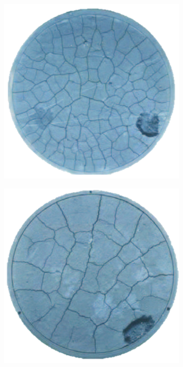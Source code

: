 \begin{figure}[!htb]
  \centering
  \begin{subfigure}{0.23\textwidth}
    \includegraphics[width=\textwidth,scale=0.5]{Chapter4/figures/3D/4mm_exp.png}
    \caption{}
  \end{subfigure}
  \hspace{0.05\textwidth}
  \begin{subfigure}{0.23\textwidth}
    \includegraphics[width=\textwidth,scale=0.5]{Chapter4/figures/3D/8mm_exp.png}

\end{subfigure}
\end{figure}
